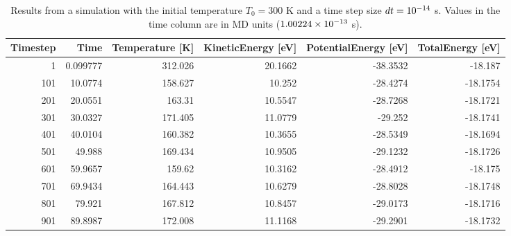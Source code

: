 \begin{table*}[htbp]
  \centering
  \caption{Results from a simulation with the initial temperature $T_0=300$ K and a
  time step size $dt = 10^{-14}$ s. Values in the time column are in MD units
  ($1.00224 \times 10^{-13}$ s). }
    \begin{tabular}{rrrrrr}
    \toprule
    Timestep & Time  & Temperature [K] & KineticEnergy [eV] & PotentialEnergy [eV] & TotalEnergy [eV] \\
\hline
    1     & 0.099777 & 312.026 & 20.1662 & -38.3532 & -18.187 \\
    101   & 10.0774 & 158.627 & 10.252 & -28.4274 & -18.1754 \\
    201   & 20.0551 & 163.31 & 10.5547 & -28.7268 & -18.1721 \\
    301   & 30.0327 & 171.405 & 11.0779 & -29.252 & -18.1741 \\
    401   & 40.0104 & 160.382 & 10.3655 & -28.5349 & -18.1694 \\
    501   & 49.988 & 169.434 & 10.9505 & -29.1232 & -18.1726 \\
    601   & 59.9657 & 159.62 & 10.3162 & -28.4912 & -18.175 \\
    701   & 69.9434 & 164.443 & 10.6279 & -28.8028 & -18.1748 \\
    801   & 79.921 & 167.812 & 10.8457 & -29.0173 & -18.1716 \\
    901   & 89.8987 & 172.008 & 11.1168 & -29.2901 & -18.1732 \\
\hline
    \end{tabular}%
  \label{tab:dt14eV}%
\end{table*}%
